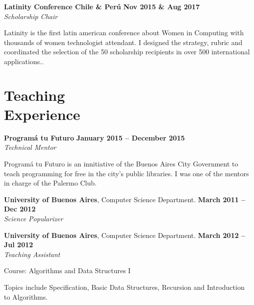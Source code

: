 \documentclass[margin,line]{resume}
\begin{document}
\begin{resume}
\textbf{Latinity Conference Chile \& Per\'u } \hfill 
 \hfill \textbf{Nov 2015 \& Aug 2017} \vspace{2mm}\\\vspace{1mm}
 \textsl{Scholarship Chair } 

Latinity is the first latin american conference about Women in Computing with thousands of women technologist attendant.
I designed the strategy, rubric and coordinated the selection of the 50 scholarship recipients in over 500 international applications..

\newpage

\section{\mysidestyle Teaching\\Experience}

\textbf{Program\'a tu Futuro} \hfill \textbf{January 2015 --  December 2015}
\\
\textsl{Technical Mentor} \hfill 
\begin{list2}
	\item Program\'a tu Futuro is an innitiative of the Buenos Aires City Government to teach programming for free in the city's public libraries. I was one of the mentors in charge of the Palermo Club.
\end{list2}\vspace{-1.5mm}

\textbf{University of Buenos Aires}, Computer Science Department. \hfill \textbf{March 2011 --  Dec 2012}
\\
\textsl{Science Popularizer} \hfill 

\textbf{University of Buenos Aires}, Computer Science Department. \hfill \textbf{March 2012 --  Jul 2012}
\\
\textsl{Teaching Assistant} \hfill
\begin{list2}
	\item Course: Algorithms and Data Structures I
	\item Topics include Specification, Basic Data Structures, Recursion and Introduction to Algorithms.
\end{list2}\vspace{-1.5mm}

\vspace{2mm}




\end{resume}
\end{document}
